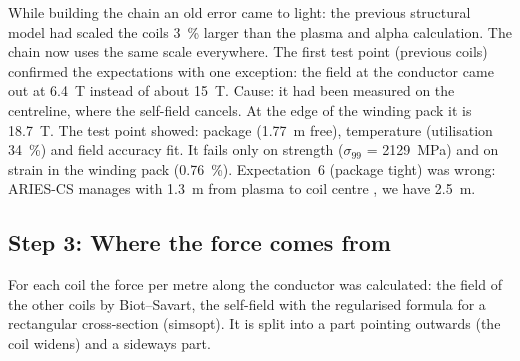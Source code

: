While building the chain an old error came to light: the previous structural model had scaled the coils 3~\% larger than
the plasma and alpha calculation. The chain now uses the same scale everywhere. The first test point (previous coils)
confirmed the expectations with one exception: the field at the conductor came out at \SI{6.4}{T} instead of about
\SI{15}{T}. Cause: it had been measured on the centreline, where the self-field cancels. At the edge of the winding pack
it is \SI{18.7}{T}. The test point showed: package (\SI{1.77}{m} free), temperature (utilisation 34~\%) and field
accuracy fit. It fails only on strength ($\sigma_{99}$ = \SI{2129}{MPa}) and on strain in the winding pack (0.76~\%). Expectation~6
(package tight) was wrong: ARIES-CS manages with \SI{1.3}{m} from plasma to coil centre \cite{elguebaly2005}, we have
\SI{2.5}{m}.

\subsection*{Step 3: Where the force comes from}
For each coil the force per metre along the conductor was calculated: the field of the other coils by Biot--Savart, the
self-field with the regularised formula for a rectangular cross-section (simsopt). It is split into a part pointing
outwards (the coil widens) and a sideways part.


